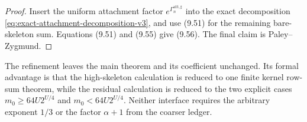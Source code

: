 \begin{proof}
Insert the uniform attachment factor
$e^{\Gamma_n^{\mathrm{att},\sharp}}$ into the exact decomposition
\eqref{eq:exact-attachment-decomposition-v3}, and use (9.51) for the remaining
bare-skeleton sum.  Equations (9.51) and (9.55) give (9.56).  The final claim is
Paley--Zygmund.
\end{proof}

The refinement leaves the main theorem and its coefficient unchanged.  Its
formal advantage is that the high-skeleton calculation is reduced to one
finite kernel row-sum theorem, while the residual calculation is reduced to
the two explicit cases $m_0\ge64U2^{U/4}$ and
$m_0<64U2^{U/4}$.  Neither interface requires
the arbitrary exponent $1/3$ or the factor $\alpha+1$ from the coarser ledger.
